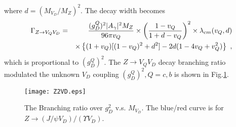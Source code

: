 \documentclass[11pt]{article}
\begin{document}
where $d=(M_{V_D}/M_Z)^2$.
The decay width becomes
\begin{eqnarray}
\Gamma _{Z\to V_Q V_D} &=&{(g_D^Q)^2|A_\gamma|^2 M_Z \over 96\pi v_Q }\times \left( {1-v_Q \over 1+d-v_Q}\right)^2 \times\lambda_{cm}(v_Q,d)\\
\nonumber &&\times \left\{ (1+v_Q)[(1-v_Q)^2+d^2]-2d(1-4v_Q+v_Q^2)\right\}\ ,
\end{eqnarray}
which is proportional to $(g_D^Q)^2$.
The $Z\to V_Q V_D$ decay branching ratio modulated the unknown $V_D$ coupling $(g^Q_D)^2,  Q=c,b$ is shown in Fig.\ref{fig:ZVQVD}.
\begin{figure}
    \centering
    \texttt{[image: Z2VD.eps]}
   \caption{The Branching ratio over $g_D^2$ v.s. $M_{V_D}$. The blue/red curve is for $Z\to (J/\psi V_D )/(\Upsilon V_D )$.}
    \label{fig:ZVQVD}
\end{figure}
\end{document}

